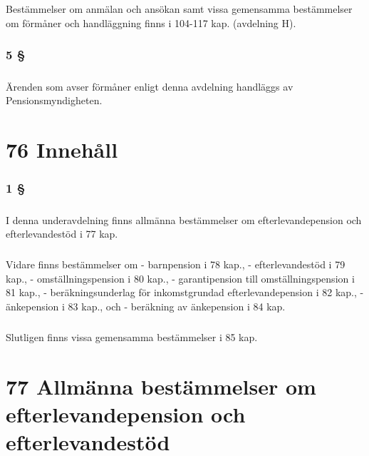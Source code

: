 \documentclass[a4paper,notitlepage,openany,10pt]{book}
\begin{document}
\paragraph*{}
Bestämmelser om anmälan och ansökan samt vissa gemensamma bestämmelser om förmåner och handläggning finns i 104-117 kap. (avdelning H).
\subsection*{5 §}
\paragraph*{}
Ärenden som avser förmåner enligt denna avdelning handläggs av Pensionsmyndigheten.
\chapter*{76 Innehåll}
\subsection*{1 §}
\paragraph*{}
I denna underavdelning finns allmänna bestämmelser om efterlevandepension och efterlevandestöd i 77 kap.
\paragraph*{}
Vidare finns bestämmelser om
\newline - barnpension i 78 kap.,
\newline - efterlevandestöd i 79 kap.,
\newline - omställningspension i 80 kap.,
\newline - garantipension till omställningspension i 81 kap.,
\newline - beräkningsunderlag för inkomstgrundad efterlevandepension i 82 kap.,
\newline - änkepension i 83 kap., och
\newline - beräkning av änkepension i 84 kap.
\paragraph*{}
Slutligen finns vissa gemensamma bestämmelser i 85 kap.
\chapter*{77 Allmänna bestämmelser om efterlevandepension och efterlevandestöd}
\end{document}
